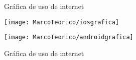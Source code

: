	\begin{figure}[hbpt!]
		\centering
		\caption{Gráfica de uso de internet}
		\label{fig:graficaiost}
		\texttt{[image: MarcoTeorico/iosgrafica]}
		\caption{Gráfica de uso de internet}
		\label{fig:graficaandroid}
		\texttt{[image: MarcoTeorico/androidgrafica]}
	\end{figure}

%	
%		
%		
%		
%		
